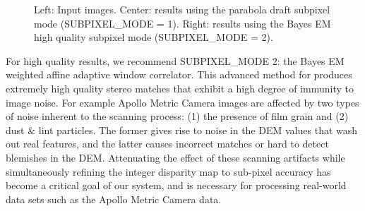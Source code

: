 \begin{figure}[h]

\caption{Left: Input images.  Center: results using the parabola draft
  subpixel mode (SUBPIXEL\_MODE = 1). Right: results using the Bayes
  EM high quality subpixel mode (SUBPIXEL\_MODE = 2).}
\label{fig:parabola_results}
\end{figure}

For high quality results, we recommend SUBPIXEL\_MODE 2: the Bayes EM
weighted affine adaptive window correlator.  This advanced method for
produces extremely high quality stereo matches that exhibit a high
degree of immunity to image noise.  For example Apollo Metric Camera
images are affected by two types of noise inherent to the scanning
process: (1) the presence of film grain and (2) dust \& lint
particles.  The former gives rise to noise in the DEM values that wash
out real features, and the latter causes incorrect matches or hard to
detect blemishes in the DEM.  Attenuating the effect of these scanning
artifacts while simultaneously refining the integer disparity map to
sub-pixel accuracy has become a critical goal of our system, and is
necessary for processing real-world data sets such as the Apollo
Metric Camera data.

